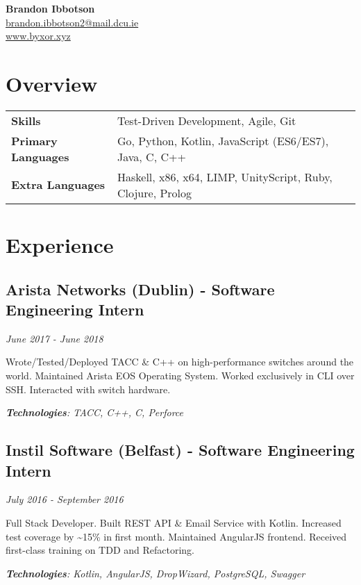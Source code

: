 \documentclass{article}
\newcommand{\youremail}[1]{\href{mailto:#1}{#1}}
\newcommand{\yourtitle}[3]{
  \begin{center}
    {\huge\bfseries #1}\\
    \vspace{.5em}
    \youremail{#2}\\
    \url{#3}\\
    \vspace{.7em}
  \end{center}
}
\begin{document}
\yourtitle{Brandon Ibbotson}{brandon.ibbotson2@mail.dcu.ie}{www.byxor.xyz}
\section{Overview}
\begin{tabularx}{\textwidth}{ll}
\vspace{0.75em}
\textbf{Skills} & Test-Driven Development, Agile, Git\\
\vspace{0.75em}
\textbf{Primary Languages} & Go, Python, Kotlin, JavaScript (ES6/ES7), Java, C, C++\\
\textbf{Extra Languages} & Haskell, x86, x64, LIMP, UnityScript, Ruby, Clojure, Prolog\\
\end{tabularx}
\section{Experience}
\subsection{Arista Networks (Dublin) - Software Engineering Intern}
\textit{June 2017 - June 2018}

Wrote/Tested/Deployed TACC \& C++ on high-performance switches around the world. Maintained Arista EOS Operating System. Worked exclusively in CLI over SSH. Interacted with switch hardware.

\textit{\textbf{Technologies}: TACC, C++, C, Perforce}
\vspace{0.5em}
\subsection{Instil Software (Belfast) - Software Engineering Intern}
\textit{July 2016 - September 2016}

Full Stack Developer. Built REST API \& Email Service with Kotlin. Increased test coverage by \textasciitilde{}15\% in first month. Maintained AngularJS frontend. Received first-class training on TDD and Refactoring.

\textit{\textbf{Technologies}: Kotlin, AngularJS, DropWizard, PostgreSQL, Swagger}
\vspace{0.5em}
\end{document}
